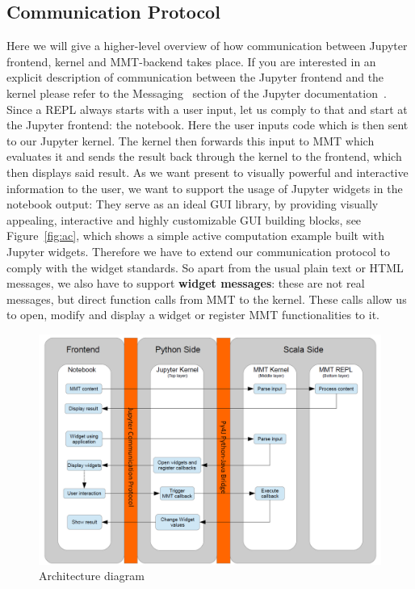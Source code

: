 \subsection{Communication Protocol}
Here we will give a higher-level overview of how communication between Jupyter frontend, kernel and MMT-backend takes place.
If you are interested in an explicit description of communication between the Jupyter frontend and the kernel please refer to the Messaging~\cite{Jupyter messaging} section of the Jupyter documentation~\cite{Jupyter documentation}.
Since a REPL always starts with a user input, let us comply to that and start at the Jupyter frontend: the notebook.
Here the user inputs code which is then sent to our Jupyter kernel.
The kernel then forwards this input to MMT which evaluates it and sends the result back through the kernel to the frontend, which then displays said result.
As we want present to visually powerful and interactive information to the user, we want to support the usage of Jupyter widgets in the notebook output:
They serve as an ideal GUI library, by providing visually appealing, interactive and highly customizable GUI building blocks, see Figure~\ref{fig:ac}, which shows a simple active computation example built with Jupyter widgets.
Therefore we have to extend our communication protocol to comply with the widget standards. So apart from the usual plain text or HTML messages, we also have to support \textbf{widget messages}: these are not real messages, but direct function calls from MMT to the kernel. These calls allow us to open, modify and display a widget or register MMT functionalities to it.
\begin{figure}[ht]\centering
  \includegraphics[width=12cm]{ArchitectureDiagram}
  \caption{Architecture diagram}\label{fig:architecture-diagram}
\end{figure}
